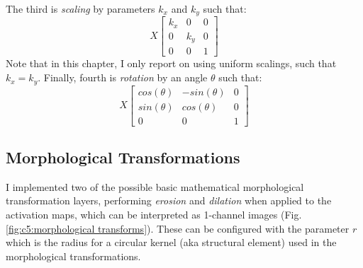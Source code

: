 \noindent The third is \emph{scaling} by parameters $k_x$ and $k_y$ such that:
\begin{equation}
X \begin{bmatrix}
k_x & 0 & 0\\
0 & k_y & 0\\
0 & 0 & 1
\end{bmatrix}
\end{equation}
Note that in this chapter, I only report on using uniform scalings, such that $k_x = k_y$. Finally, fourth is \emph{rotation} by an angle $\theta$ such that:
\begin{equation}
X \begin{bmatrix}
cos(\theta) & -sin(\theta) & 0\\
sin(\theta) & cos(\theta) & 0\\
0 & 0 & 1
\end{bmatrix}
\end{equation}

\subsection{Morphological Transformations}

I implemented two of the possible basic mathematical morphological transformation layers, performing \emph{erosion} and \emph{dilation} \citep{soille1999erosion} when applied to the activation maps, which can be interpreted as 1-channel images  (Fig. \ref{fig:c5:morphological transforms}). 
These can be configured with the parameter $r$ which is the radius for a circular kernel (aka structural element) used in the morphological transformations.

